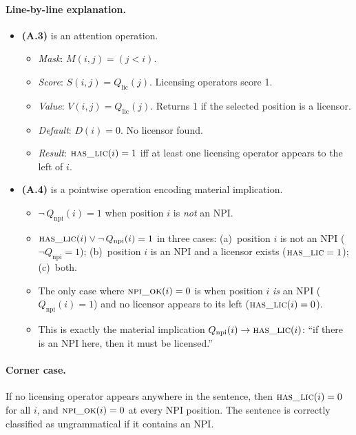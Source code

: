 \documentclass[11pt]{article}
\begin{document}
\paragraph{Line-by-line explanation.}
\begin{itemize}[itemsep=3pt,leftmargin=*]
    \item \textbf{(A.3)} is an attention operation.
    \begin{itemize}[itemsep=1pt,leftmargin=*]
        \item \textit{Mask}: $M(i,j) = (j < i)$.
        \item \textit{Score}: $S(i,j) = Q_\text{lic}(j)$. Licensing operators score 1.
        \item \textit{Value}: $V(i,j) = Q_\text{lic}(j)$. Returns 1 if the selected position is a licensor.
        \item \textit{Default}: $D(i) = 0$. No licensor found.
        \item \textit{Result}: $\textsc{has\_lic}(i) = 1$ iff at least one licensing operator appears to the left of $i$.
    \end{itemize}
    \item \textbf{(A.4)} is a pointwise operation encoding material implication.
    \begin{itemize}[itemsep=1pt,leftmargin=*]
        \item $\neg\, Q_\text{npi}(i) = 1$ when position $i$ is \emph{not} an NPI.
        \item $\textsc{has\_lic}(i) \lor \neg\, Q_\text{npi}(i) = 1$ in three cases: (a)~position $i$ is not an NPI ($\neg Q_\text{npi} = 1$); (b)~position $i$ is an NPI and a licensor exists ($\textsc{has\_lic} = 1$); (c)~both.
        \item The only case where $\textsc{npi\_ok}(i) = 0$ is when position $i$ \emph{is} an NPI ($Q_\text{npi}(i) = 1$) and no licensor appears to its left ($\textsc{has\_lic}(i) = 0$).
        \item This is exactly the material implication $Q_\text{npi}(i) \to \textsc{has\_lic}(i)$: ``if there is an NPI here, then it must be licensed.''
    \end{itemize}
\end{itemize}

\paragraph{Corner case.}
If no licensing operator appears anywhere in the sentence, then $\textsc{has\_lic}(i) = 0$ for all $i$, and $\textsc{npi\_ok}(i) = 0$ at every NPI position. The sentence is correctly classified as ungrammatical if it contains an NPI.
\end{document}

